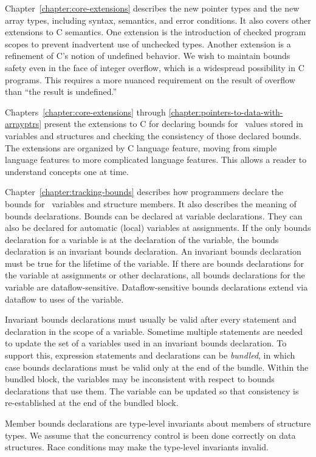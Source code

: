 Chapter~\ref{chapter:core-extensions} describes
the new pointer types and the new array types, including syntax,
semantics, and error conditions. It also covers other extensions to C
semantics. One extension is the introduction of checked program scopes to
prevent inadvertent use of unchecked types. Another extension is a
refinement of C's notion of undefined behavior. We wish to maintain
bounds safety even in the face of integer overflow, which is a
widespread possibility in C programs. This requires a more nuanced
requirement on the result of overflow than ``the result is undefined.''

Chapters~\ref{chapter:core-extensions} through
\ref{chapter:pointers-to-data-with-arrayptrs}
present the extensions to C for declaring bounds
for \arrayptr\ values stored in variables and structures and
checking the consistency of those declared bounds. The extensions are
organized by C language feature, moving from simple language features to
more complicated language features. This allows a reader to understand
concepts one at time.

Chapter~\ref{chapter:tracking-bounds} describes how programmers declare the bounds for
\arrayptr\ variables and structure members. It also describes the meaning of bounds declarations.
Bounds can be declared at variable declarations. They can also be
declared for automatic (local) variables at assignments. If the only
bounds declaration for a variable is at the declaration of the variable,
the bounds declaration is an invariant bounds declaration. An invariant
bounds declaration must be true for the lifetime of the variable. If
there are bounds declarations for the variable at assignments or other
declarations, all bounds declarations for the variable are
dataflow-sensitive. Dataflow-sensitive bounds declarations extend via
dataflow to uses of the variable.

Invariant bounds declarations must usually be valid after every
statement and declaration in the scope of a variable. Sometime multiple
statements are needed to update the set of a variables used in an
invariant bounds declaration. To support this, expression statements and
declarations can be \emph{bundled}, in which case bounds declarations
must be valid only at the end of the bundle. Within the bundled block,
the variables may be inconsistent with respect to bounds declarations
that use them. The variable can be updated so that consistency is
re-established at the end of the bundled block.

Member bounds declarations are type-level invariants about members
of structure types. We assume that the concurrency control is
been done correctly on data structures.  Race conditions may
make the type-level invariants invalid.

